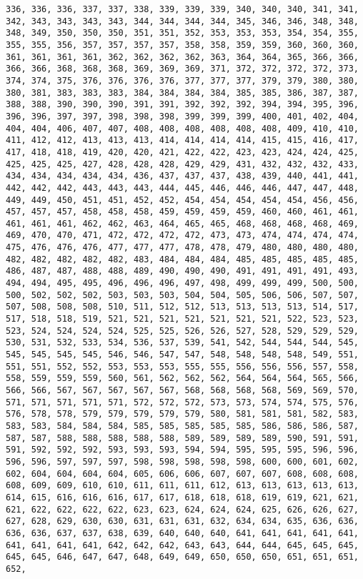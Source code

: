 \documentclass[11pt]{article}
\begin{document}
\begin{Verbatim}[commandchars=\\\{\}]
336, 336, 336, 337, 337, 338, 339, 339, 339, 340, 340, 340, 341, 341, 342, 343, 343, 343, 343, 344, 344, 344, 344, 345, 346, 346, 348, 348, 348, 349, 350, 350, 350, 351, 351, 352, 353, 353, 353, 354, 354, 355, 355, 355, 356, 357, 357, 357, 357, 358, 358, 359, 359, 360, 360, 360, 361, 361, 361, 361, 362, 362, 362, 362, 363, 364, 364, 365, 366, 366, 366, 366, 368, 368, 368, 369, 369, 369, 371, 372, 372, 372, 372, 373, 374, 374, 375, 376, 376, 376, 376, 377, 377, 377, 379, 379, 380, 380, 380, 381, 383, 383, 383, 384, 384, 384, 384, 385, 385, 386, 387, 387, 388, 388, 390, 390, 390, 391, 391, 392, 392, 392, 394, 394, 395, 396, 396, 396, 397, 397, 398, 398, 398, 399, 399, 399, 400, 401, 402, 404, 404, 404, 406, 407, 407, 408, 408, 408, 408, 408, 408, 409, 410, 410, 411, 412, 412, 413, 413, 413, 414, 414, 414, 414, 415, 415, 416, 417, 417, 418, 418, 419, 420, 420, 421, 422, 422, 423, 423, 424, 424, 425, 425, 425, 425, 427, 428, 428, 428, 429, 429, 431, 432, 432, 432, 433, 434, 434, 434, 434, 434, 436, 437, 437, 437, 438, 439, 440, 441, 441, 442, 442, 442, 443, 443, 443, 444, 445, 446, 446, 446, 447, 447, 448, 449, 449, 450, 451, 451, 452, 452, 454, 454, 454, 454, 454, 456, 456, 457, 457, 457, 458, 458, 458, 459, 459, 459, 459, 460, 460, 461, 461, 461, 461, 461, 462, 462, 463, 464, 465, 465, 468, 468, 468, 468, 469, 469, 470, 470, 471, 472, 472, 472, 472, 473, 473, 474, 474, 474, 474, 475, 476, 476, 476, 477, 477, 477, 478, 478, 479, 480, 480, 480, 480, 482, 482, 482, 482, 482, 483, 484, 484, 484, 485, 485, 485, 485, 485, 486, 487, 487, 488, 488, 489, 490, 490, 490, 491, 491, 491, 491, 493, 494, 494, 495, 495, 496, 496, 496, 497, 498, 499, 499, 499, 500, 500, 500, 502, 502, 502, 503, 503, 503, 504, 504, 505, 506, 506, 507, 507, 507, 508, 508, 508, 510, 511, 512, 512, 513, 513, 513, 513, 514, 517, 517, 518, 518, 519, 521, 521, 521, 521, 521, 521, 521, 522, 523, 523, 523, 524, 524, 524, 524, 525, 525, 526, 526, 527, 528, 529, 529, 529, 530, 531, 532, 533, 534, 536, 537, 539, 541, 542, 544, 544, 544, 545, 545, 545, 545, 545, 546, 546, 547, 547, 548, 548, 548, 548, 549, 551, 551, 551, 552, 552, 553, 553, 553, 555, 555, 556, 556, 556, 557, 558, 558, 559, 559, 559, 560, 561, 562, 562, 562, 564, 564, 564, 565, 566, 566, 566, 567, 567, 567, 567, 567, 568, 568, 568, 568, 569, 569, 570, 571, 571, 571, 571, 571, 572, 572, 572, 573, 573, 574, 574, 575, 576, 576, 578, 578, 579, 579, 579, 579, 579, 580, 581, 581, 581, 582, 583, 583, 583, 584, 584, 584, 585, 585, 585, 585, 585, 586, 586, 586, 587, 587, 587, 588, 588, 588, 588, 588, 589, 589, 589, 589, 590, 591, 591, 591, 592, 592, 592, 593, 593, 593, 594, 594, 595, 595, 595, 596, 596, 596, 596, 597, 597, 597, 598, 598, 598, 598, 598, 600, 600, 601, 602, 602, 604, 604, 604, 604, 605, 606, 606, 607, 607, 607, 608, 608, 608, 608, 609, 609, 610, 610, 611, 611, 611, 612, 613, 613, 613, 613, 613, 614, 615, 616, 616, 616, 617, 617, 618, 618, 618, 619, 619, 621, 621, 621, 622, 622, 622, 622, 623, 623, 624, 624, 624, 625, 626, 626, 627, 627, 628, 629, 630, 630, 631, 631, 631, 632, 634, 634, 635, 636, 636, 636, 636, 637, 637, 638, 639, 640, 640, 640, 641, 641, 641, 641, 641, 641, 641, 641, 641, 642, 642, 642, 643, 643, 644, 644, 645, 645, 645, 645, 645, 646, 647, 647, 648, 649, 649, 650, 650, 650, 651, 651, 651, 652, 
\end{Verbatim}
\end{document}
